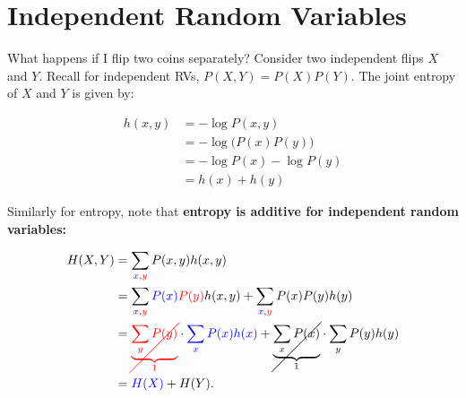 \section{Independent Random Variables}

What happens if I flip two coins separately? Consider two independent flips $X$ and $Y$. Recall for independent RVs, $P(X, Y) = P(X)P(Y)$. The joint entropy of $X$ and $Y$ is given by:

\begin{align*}
    h(x, y) &= -\log P(x, y) \\
            &= -\log \big(P(x) P(y)\big) \\
            &= -\log P(x) - \log P(y) \\
            &= h(x) + h(y)
\end{align*}

Similarly for entropy, note that \textbf{entropy is additive for independent random variables:}


\begin{align*}
    H(X, Y) &= \sum_{\textcolor{blue}{x}, \textcolor{red}{y}} P(x, y) h(x, y) \\
            &= \sum_{\textcolor{blue}{x}, \textcolor{red}{y}} \textcolor{blue}{P(x)} \textcolor{red}{P(y)} h(x, y) + \sum_{\textcolor{blue}{x}, \textcolor{red}{y}} P(x) P(y) h(y) \\
            &= \textcolor{red}{\cancel{\underbrace{\sum_{y} \textcolor{red}{P(y)}}_{\textcolor{red}{1}}}} 
               \cdot \textcolor{blue}{\sum_{x} \textcolor{blue}{P(x)} h(x)} 
               + \cancel{\underbrace{\sum_{x} P(x)}_{1}} \cdot \sum_{y} P(y) h(y) \\
            &= \textcolor{blue}{H(X)} + H(Y).
\end{align*}


